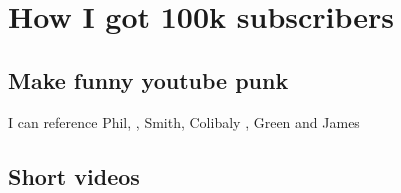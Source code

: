 \chapter{How I got 100k subscribers}

\section{Make funny youtube punk}

I can reference Phil, \cite{phil99}, Smith\cite{smit54}, Colibaly \cite{colu92}, Green \cite{gree00} and James \cite{jame76}
\section{Short videos}